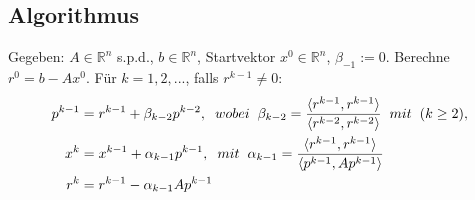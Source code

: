 \documentclass{article}
\begin{document}
\subsection{Algorithmus}
Gegeben: $A \in \mathbb{R}^{n}$ s.p.d., $b \in \mathbb{R}^{n}$, Startvektor $x^{0} \in \mathbb{R}^{n}$, $\beta_{-1} := 0$. Berechne $r^{0} = b - Ax^{0}$. Für $k = 1,2,...$, falls $r^{k-1} \ne 0$:
\begin{subequations}
\begin{align}
	p^{k-1} &= r^{k-1} + \beta_{k-2}p^{k-2}, \hspace{2mm} wobei \hspace{2mm} \beta_{k-2} = \frac {\langle r^{k-1}, r^{k-1} \rangle} {\langle r^{k-2}, r^{k-2} \rangle} \hspace{2mm} mit \hspace{2mm} (k \ge 2),\\
	x^{k} &= x^{k-1} + \alpha_{k-1}p^{k-1}, \hspace{2mm} mit \hspace{2mm} \alpha_{k-1} = \frac {\langle r^{k-1}, r^{k-1} \rangle} {\langle p^{k-1}, Ap^{k-1} \rangle}\\
	r^{k} &= r^{k-1} - \alpha_{k-1}Ap^{k-1}
\end{align}
\end{subequations}
\end{document}
